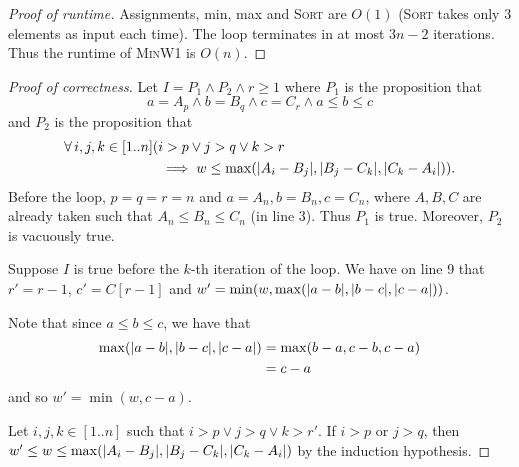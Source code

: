 \documentclass[12pt]{article}
\begin{document}
\begin{solution}
\begin{enumerate}[wide]
\begin{proof}[Proof of runtime]
                Assignments, min, max and \textsc{Sort} are $O(1)$ (\textsc{Sort}
                takes only $3$ elements as input each time).
                The loop terminates in at most $3n - 2$ iterations.
                Thus the runtime of \textsc{MinW1} is $O(n)$.
            \end{proof}
            \begin{proof}[Proof of correctness]
                Let $I = P_1 \land P_2 \land r \geq 1$ where $P_1$ is the proposition that \[
                    a = A_{p} \land b = B_{q} \land c = C_{r} \land a \leq b \leq c
                \] and $P_2$ is the proposition that
                \begin{align*}
                    \forall i, j, k \in [1..n] (&i > p \lor j > q \lor k > r \\
                                        &\implies w \leq \max(\abs{A_{i} - B_{j}}, \abs{B_{j} - C_{k}}, \abs{C_{k} - A_{i}})).
                \end{align*}
                Before the loop, $p = q = r = n$ and $a = A_{n}, b = B_{n}, c = C_{n}$,
                where $A, B, C$ are already taken such that $A_{n} \leq B_{n} \leq C_{n}$
                (in line $3$).
                Thus $P_1$ is true.
                Moreover, $P_2$ is vacuously true.
                
                Suppose $I$ is true before the $k$-th iteration of the loop.
                We have on line 9 that $r' = r - 1$, $c' = C[r - 1]$ and
                $w' = \min(w, \max(\abs{a - b}, \abs{b - c}, \abs{c - a}))$.

                Note that since $a \leq b \leq c$, we have that
                \begin{align*}
                    \max(\abs{a - b}, \abs{b - c}, \abs{c - a})
                        &= \max(b - a, c - b, c - a) \\
                        &= c - a
                \end{align*}
                and so $w' = \min(w, c - a)$.

                Let $i, j, k \in [1..n]$ such that $i > p \lor j > q \lor k > r'$.
                If $i > p$ or $j > q$, then
                $w' \leq w \leq \max(\abs{A_{i} - B_{j}}, \abs{B_{j} - C_{k}}, \abs{C_{k} - A_{i}})$
                by the induction hypothesis.


\end{proof}
\end{enumerate}
\end{solution}
\end{document}

